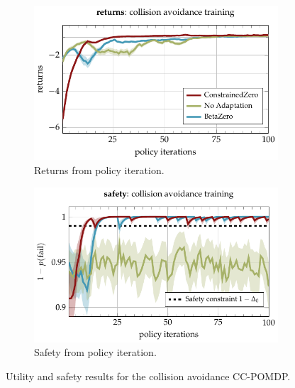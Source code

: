 \begin{figure}[t]
    \centering
    
    \begin{subfigure}[b]{0.48\textwidth}
        \centering
        \includegraphics[width=\textwidth]{figures/constrainedzero/results/cas_returns.pdf}
        \caption{Returns from policy iteration.}
        \label{fig:cas_results_returns}
    \end{subfigure}
    \hfill
    \begin{subfigure}[b]{0.48\textwidth}
        \centering
        \includegraphics[width=\textwidth]{figures/constrainedzero/results/cas_accuracy.pdf}
        \caption{Safety from policy iteration.}
        \label{fig:cas_results_safety}
    \end{subfigure}

    \caption{Utility and safety results for the collision avoidance CC-POMDP.}
    \label{fig:cas_results_performance}
\end{figure}



